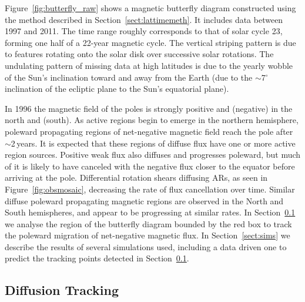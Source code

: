 Figure~\ref{fig:butterfly_raw} shows a magnetic butterfly diagram constructed using the method described in Section~\ref{sect:lattimemeth}. It includes data between 1997 and 2011. The time range roughly corresponds to that of solar cycle 23, forming one half of a 22-year magnetic cycle. 
The vertical striping pattern is due to features rotating onto the solar disk over successive solar rotations. The undulating pattern of missing data at high latitudes is due to the yearly wobble of the Sun's inclination toward and away from the Earth (due to the $\sim$7$^{\circ}$ inclination of the ecliptic plane to the Sun's equatorial plane).

In 1996 the magnetic field of the poles is strongly positive and (negative) in the north and (south). As active regions begin to emerge in the northern hemisphere, poleward propagating regions of net-negative magnetic field reach the pole after $\sim$2\,years. It is expected that these regions of diffuse flux have one or more active region sources. Positive weak flux also diffuses and progresses poleward, but much of it is likely to have canceled with the negative flux closer to the equator before arriving at the pole. 
Differential rotation shears diffusing ARs, as seen in Figure~\ref{fig:obsmosaic}, decreasing the rate of flux cancellation over time. Similar diffuse poleward propagating magnetic regions are observed in the North and South hemispheres, and appear to be progressing at similar rates. In Section~\ref{sect:difftrack} we analyse the region of the butterfly diagram bounded by the red box to track the poleward migration of net-negative magnetic flux. In Section~\ref{sect:sims} we describe the results of several simulations used, including a data driven one to predict the tracking points detected in Section~\ref{sect:difftrack}.


\subsection{Diffusion Tracking}\label{sect:difftrack}

